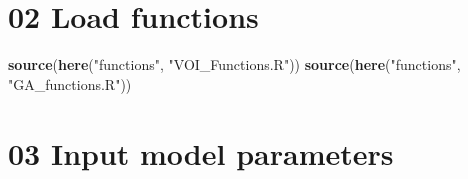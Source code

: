 \documentclass[
]{article}
\newenvironment{Shaded}{\begin{snugshade}}{\end{snugshade}}
\newcommand{\KeywordTok}[1]{\textcolor[rgb]{0.13,0.29,0.53}{\textbf{#1}}}
\newcommand{\NormalTok}[1]{#1}
\newcommand{\StringTok}[1]{\textcolor[rgb]{0.31,0.60,0.02}{#1}}
\begin{document}
\hypertarget{load-functions}{%
\section{02 Load functions}\label{load-functions}}

\begin{Shaded}
\begin{Highlighting}[]
\KeywordTok{source}\NormalTok{(}\KeywordTok{here}\NormalTok{(}\StringTok{"functions"}\NormalTok{, }\StringTok{"VOI_Functions.R"}\NormalTok{))}
\KeywordTok{source}\NormalTok{(}\KeywordTok{here}\NormalTok{(}\StringTok{"functions"}\NormalTok{, }\StringTok{"GA_functions.R"}\NormalTok{))}
\end{Highlighting}
\end{Shaded}

\hypertarget{input-model-parameters}{%
\section{03 Input model parameters}\label{input-model-parameters}}
\end{document}
